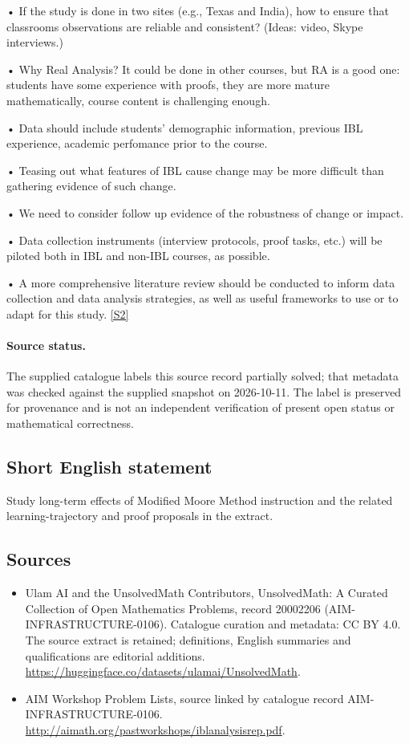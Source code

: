 \documentclass[11pt]{article}
\newcommand{\sref}[2]{\hyperlink{source:#1:#2}{[S#2]}}
\begin{document}
• If the study is done in two sites (e.g., Texas and India), how to ensure that classrooms observations are reliable and consistent? (Ideas: video, Skype interviews.)

• Why Real Analysis? It could be done in other courses, but RA is a good one: students have some experience with proofs, they are more mature mathematically, course content is challenging enough.

• Data should include students' demographic information, previous IBL experience, academic perfomance prior to the course.

• Teasing out what features of IBL cause change may be more difficult than gathering evidence of such change.

• We need to consider follow up evidence of the robustness of change or impact.

• Data collection instruments (interview protocols, proof tasks, etc.) will be piloted both in IBL and non-IBL courses, as possible.

• A more comprehensive literature review should be conducted to inform data collection and data analysis strategies, as well as useful frameworks to use or to adapt for this study. \sref{20002206}{2}
\paragraph{Source status.}
The supplied catalogue labels this source record partially solved; that metadata was checked against the supplied snapshot on 2026-10-11. The label is preserved for provenance and is not an independent verification of present open status or mathematical correctness.
\subsection{Short English statement}
Study long-term effects of Modified Moore Method instruction and the related learning-trajectory and proof proposals in the extract.
\subsection{Sources}
\begin{itemize}
\item[\hypertarget{source:20002206:1}{S1}] Ulam AI and the UnsolvedMath Contributors, UnsolvedMath: A Curated Collection of Open Mathematics Problems, record 20002206 (AIM-INFRASTRUCTURE-0106). Catalogue curation and metadata: CC BY 4.0. The source extract is retained; definitions, English summaries and qualifications are editorial additions.
\url{https://huggingface.co/datasets/ulamai/UnsolvedMath}.
\item[\hypertarget{source:20002206:2}{S2}] AIM Workshop Problem Lists, source linked by catalogue record AIM-INFRASTRUCTURE-0106.
\url{http://aimath.org/pastworkshops/iblanalysisrep.pdf}.
\end{itemize}
\end{document}
